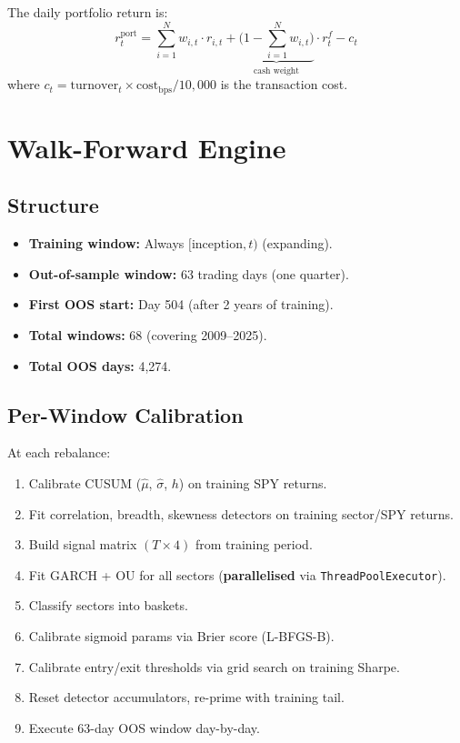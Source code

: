 \documentclass[11pt,a4paper]{article}
\begin{document}
The daily portfolio return is:
\begin{equation}
  r_t^{\mathrm{port}} = \sum_{i=1}^{N} w_{i,t} \cdot r_{i,t} + \underbrace{\Big(1 - \sum_{i=1}^{N} w_{i,t}\Big)}_{\text{cash weight}} \cdot r_t^f - c_t
\end{equation}
where $c_t = \text{turnover}_t \times \text{cost}_{\mathrm{bps}} / 10{,}000$ is the transaction cost.

\section{Walk-Forward Engine}
\label{sec:walkforward}

\subsection{Structure}

\begin{itemize}[nosep]
  \item \textbf{Training window:} Always $[\text{inception}, t)$ (expanding).
  \item \textbf{Out-of-sample window:} 63 trading days (one quarter).
  \item \textbf{First OOS start:} Day 504 (after 2 years of training).
  \item \textbf{Total windows:} 68 (covering 2009--2025).
  \item \textbf{Total OOS days:} 4,274.
\end{itemize}

\subsection{Per-Window Calibration}

At each rebalance:
\begin{enumerate}[nosep]
  \item Calibrate CUSUM ($\hat{\mu}$, $\hat{\sigma}$, $h$) on training SPY returns.
  \item Fit correlation, breadth, skewness detectors on training sector/SPY returns.
  \item Build signal matrix $(T \times 4)$ from training period.
  \item Fit GARCH + OU for all sectors (\textbf{parallelised} via \texttt{ThreadPoolExecutor}).
  \item Classify sectors into baskets.
  \item Calibrate sigmoid params via Brier score (L-BFGS-B).
  \item Calibrate entry/exit thresholds via grid search on training Sharpe.
  \item Reset detector accumulators, re-prime with training tail.
  \item Execute 63-day OOS window day-by-day.
\end{enumerate}
\end{document}
